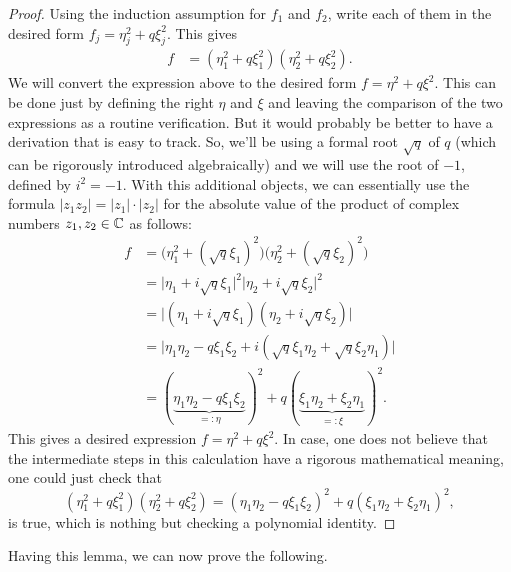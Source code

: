 \begin{proof}
	Using the induction assumption for $f_1$ and $f_2$, write each of them in the desired form $f_j = \eta_j^2 + q \xi_j^2$. This gives 
	\begin{align*}
		f & = (\eta_1^2 + q \xi_1^2) (\eta_2^2 + q \xi_2^2) .
	\end{align*}
	We will convert the expression above to the desired form $ f= \eta^2 + q \xi^2$. This can be done just by defining the right $\eta$ and $\xi$ and leaving the comparison of the two expressions as a routine verification. But it would probably be better to have a derivation that is easy to track. So, we'll be using a formal root $\sqrt{q}$ of $q$ (which can be rigorously introduced algebraically) and we will use the root of $-1$, defined by $i^2 = -1$. With this additional objects, we can essentially use the formula $|z_1 z_2| = |z_1| \cdot |z_2|$ for the absolute value of the product of complex numbers $z_1, z_2 \in \mathbb{C}$ as follows: 
	\begin{align*}
		f & = \bigl(\eta_1^2 + ( \sqrt{q} \xi_1)^2 \bigr) \bigl(\eta_2^2 + (\sqrt{q} \xi_2)^2 \bigr) 
		 \\ & = \bigl | \eta_1 + i \sqrt{q} \xi_1 \bigr|^2 \bigl| \eta_2 + i \sqrt{q} \xi_2 \bigr|^2
		 \\ & = \bigl | (\eta_1 + i \sqrt{q} \xi_1) (\eta_2 + i \sqrt{q} \xi_2) \bigr|
		 \\ & = \bigl| \eta_1 \eta_2 - q \xi_1 \xi_2 + i (\sqrt{q} \xi_1 \eta_2 + \sqrt{q} \xi_2 \eta_1 ) \bigr|
		 \\ & = (\underbrace{\eta_1 \eta_2 - q \xi_1 \xi_2}_{=:\eta})^2 + q ( \underbrace{\xi_1 \eta_2 + \xi_2 \eta_1}_{=:\xi})^2.
	\end{align*}
	This gives a desired expression $ f= \eta^2 + q \xi^2$. In case, one does not believe that the intermediate steps in this calculation have a rigorous mathematical meaning, one could just check that 
	\[
		(\eta_1^2 + q \xi_1^2) (\eta_2^2 + q \xi_2^2) = (\eta_1 \eta_2 - q \xi_1 \xi_2)^2 + q (\xi_1 \eta_2 + \xi_2 \eta_1)^2,
	\]
	is true, which is nothing but checking a polynomial identity. 
\end{proof}

Having this lemma, we can now prove the following. 

